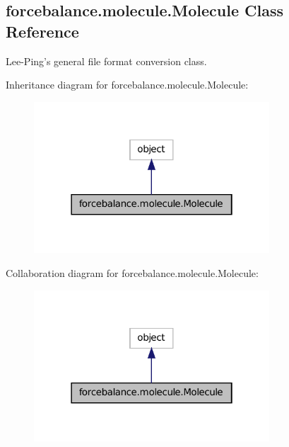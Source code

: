 \hypertarget{classforcebalance_1_1molecule_1_1Molecule}{\subsection{forcebalance.\-molecule.\-Molecule Class Reference}
\label{classforcebalance_1_1molecule_1_1Molecule}
}


Lee-\/\-Ping's general file format conversion class.  




Inheritance diagram for forcebalance.\-molecule.\-Molecule\-:
\nopagebreak
\begin{figure}[H]
\begin{center}
\leavevmode
\includegraphics[width=250pt]{classforcebalance_1_1molecule_1_1Molecule__inherit__graph}
\end{center}
\end{figure}


Collaboration diagram for forcebalance.\-molecule.\-Molecule\-:
\nopagebreak
\begin{figure}[H]
\begin{center}
\leavevmode
\includegraphics[width=250pt]{classforcebalance_1_1molecule_1_1Molecule__coll__graph}
\end{center}
\end{figure}

